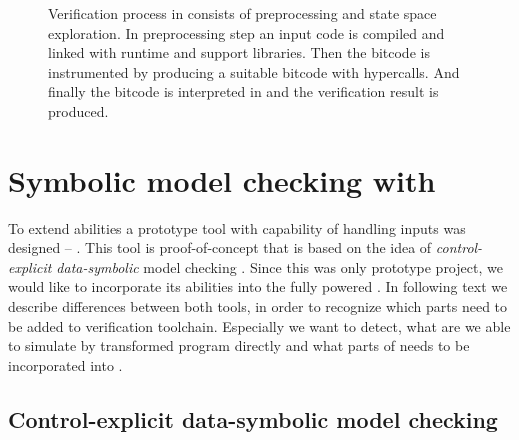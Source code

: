 \begin{figure}[!ht]
{
}
\caption{Verification process in \DIVINE consists of preprocessing and
state space exploration. In preprocessing step an input code is
compiled and linked with \DIOS runtime and \DIVINE support
libraries. Then the bitcode is instrumented by \LART producing a suitable \LLVM bitcode with \DIVM hypercalls. And finally the bitcode is interpreted in \DIVM and the verification result is produced.}\label{fig:verification}
\end{figure}

\section{Symbolic model checking with \SymDIVINE}\label{sub:symdivine}

To extend \DIVINE abilities a prototype tool with capability of handling inputs
was designed -- \SymDIVINE.  This tool is proof-of-concept that is based on the
idea of \emph{control-explicit data-symbolic} model checking \cite{Barnat14}.
Since this was only prototype project, we would like to incorporate its
abilities into the fully powered \DIVINE. In following text we describe
differences between both tools, in order to recognize which parts need to be added
to \DIVINE verification toolchain. Especially we want to detect, what are we
able to simulate by transformed program directly and what parts of \SymDIVINE
needs to be incorporated into \DIVINE.

\subsection{Control-explicit data-symbolic model checking}

